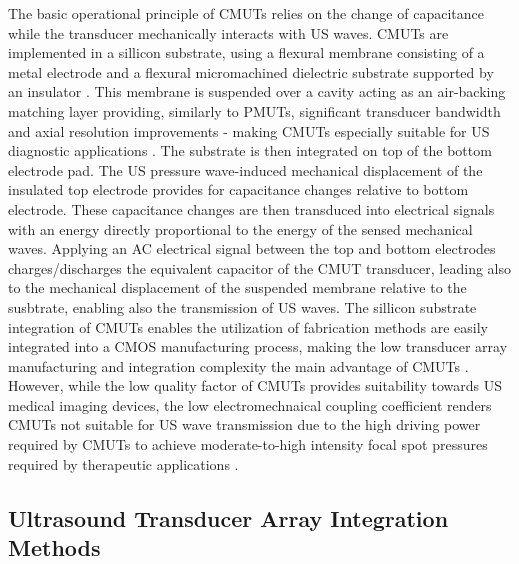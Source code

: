 The basic operational principle of CMUTs relies on the change of capacitance while the transducer mechanically 
interacts with US waves. CMUTs are implemented in a sillicon substrate, using a flexural membrane consisting 
of a metal electrode and a flexural micromachined dielectric substrate supported by an insulator \cite{https://doi.org/10.1109/TUFFC.2021.3112917}. 
This membrane is suspended over a cavity acting as an air-backing matching layer providing, similarly to PMUTs, 
significant transducer bandwidth and axial resolution improvements - making CMUTs especially suitable for US 
diagnostic applications \cite{https://doi.org/10.1016/j.jmu.2012.02.001, 10.1109/ACCESS.2024.3359906}. 
The substrate is then integrated on top of the bottom electrode pad. The 
US pressure wave-induced mechanical displacement of the insulated top electrode provides for capacitance 
changes relative to bottom electrode. These capacitance changes are then transduced into electrical signals 
with an energy directly proportional to the energy of the sensed mechanical waves. 
Applying an AC electrical signal between the top and bottom electrodes charges/discharges the 
equivalent capacitor of the CMUT transducer, leading also to the mechanical displacement of the suspended membrane relative to the susbtrate, enabling also the 
transmission of US waves. The sillicon substrate integration of CMUTs enables the utilization of 
fabrication methods are easily integrated into a CMOS manufacturing process, making the low transducer array manufacturing and integration complexity the main advantage of CMUTs \cite{10.1109/TUFFC.2021.3112917, 10.1109/ACCESS.2024.3359906, https://www.nature.com/articles/s41378-024-00783-5}. However, while the low quality factor of CMUTs provides suitability towards US medical imaging devices, the low electromechnaical coupling coefficient renders CMUTs not suitable for US wave transmission due to the high driving power required by CMUTs to achieve moderate-to-high intensity focal spot pressures required by therapeutic applications \cite{10.1109/TUFFC.2021.3112917, 10.1109/ULTSYM.2012.0020}.


\subsection{Ultrasound Transducer Array Integration Methods}
\label{subsec:ultrasound_transducer_system_integration}


